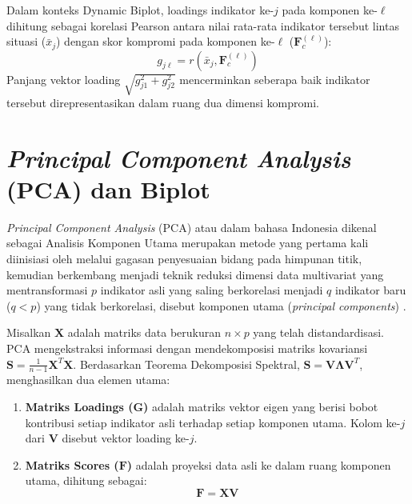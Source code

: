 Dalam konteks Dynamic Biplot, loadings indikator ke-$j$ pada komponen ke-$\ell$ dihitung sebagai korelasi Pearson antara nilai rata-rata indikator tersebut lintas situasi ($\bar{x}_j$) dengan skor kompromi pada komponen ke-$\ell$ ($\mathbf{F}_c^{(\ell)}$):
\begin{equation}
  g_{j\ell} = r(\bar{x}_j, \mathbf{F}_c^{(\ell)})
\end{equation}
Panjang vektor loading $\sqrt{g_{j1}^2 + g_{j2}^2}$ mencerminkan seberapa baik indikator tersebut direpresentasikan dalam ruang dua dimensi kompromi.

\section{\normalsize \textit{Principal Component Analysis} (PCA) dan Biplot}

\textit{Principal Component Analysis} (PCA) atau dalam bahasa Indonesia dikenal sebagai Analisis Komponen Utama merupakan metode yang pertama kali diinisiasi oleh \citet{pearson1901} melalui gagasan penyesuaian bidang pada himpunan titik, kemudian berkembang menjadi teknik reduksi dimensi data multivariat yang mentransformasi $p$ indikator asli yang saling berkorelasi menjadi $q$ indikator baru ($q < p$) yang tidak berkorelasi, disebut komponen utama (\textit{principal components}) \citep{hotelling1933}.

Misalkan $\mathbf{X}$ adalah matriks data berukuran $n \times p$ yang telah distandardisasi. PCA mengekstraksi informasi dengan mendekomposisi matriks kovariansi $\mathbf{S} = \frac{1}{n-1}\mathbf{X}^T\mathbf{X}$. Berdasarkan Teorema Dekomposisi Spektral, $\mathbf{S} = \mathbf{V} \mathbf{\Lambda} \mathbf{V}^T$, menghasilkan dua elemen utama:
\begin{enumerate}
    \item \textbf{Matriks Loadings ($\mathbf{G}$)} adalah matriks vektor eigen yang berisi bobot kontribusi setiap indikator asli terhadap setiap komponen utama. Kolom ke-$j$ dari $\mathbf{V}$ disebut vektor loading ke-$j$.
    \item \textbf{Matriks Scores ($\mathbf{F}$)} adalah proyeksi data asli ke dalam ruang komponen utama, dihitung sebagai:
    \begin{equation}
        \mathbf{F} = \mathbf{X} \mathbf{V}
    \end{equation}
\end{enumerate}

